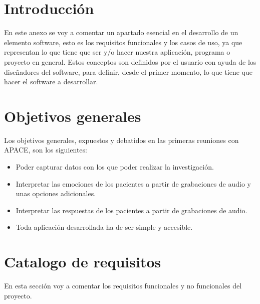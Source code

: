 
\section{Introducción}
En este anexo se voy a comentar un apartado esencial en el desarrollo de un elemento software, esto es los requisitos funcionales y los casos de uso, ya que representan lo que tiene que ser y/o hacer nuestra aplicación, programa o proyecto en general. Estos conceptos son definidos por el usuario con ayuda de los diseñadores del software, para definir, desde el primer momento, lo que tiene que hacer el software a desarrollar.
\section{Objetivos generales}
Los objetivos generales, expuestos y debatidos en las primeras reuniones con APACE, son los siguientes:
\begin{itemize}
	\item Poder capturar datos con los que poder realizar la investigación.
	\item Interpretar las emociones de los pacientes a partir de grabaciones de audio y unas opciones adicionales.
	\item Interpretar las respuestas de los pacientes a partir de grabaciones de audio.
	\item Toda aplicación desarrollada ha de ser simple y accesible.
\end{itemize}
\section{Catalogo de requisitos}
En esta sección voy a comentar los requisitos funcionales y no funcionales del proyecto.
